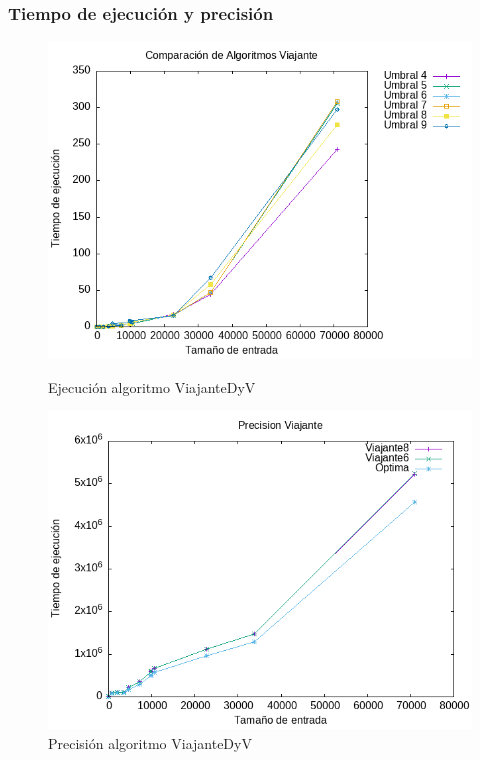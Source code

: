 \documentclass[11pt,openany]{book}
\begin{document}
\subsubsection*{Tiempo de ejecución y precisión}
\begin{figure}[H]
      \centering
      \begin{minipage}[b]{0.45\textwidth}
          \includegraphics[width=1.1\textwidth]{assets/Img/UmbralP3.png}
          \caption{Ejecución algoritmo ViajanteDyV}
          \label{fig:ViajanteDyV}
      \end{minipage}
      \hfill
      \begin{minipage}[b]{0.45\textwidth}
          \includegraphics[width=1\textwidth]{assets/Img/Precision.png}
          \caption{Precisión algoritmo ViajanteDyV}
          \label{fig:ViajanteDyVPrecision}
      \end{minipage}
\end{figure}
\end{document}
